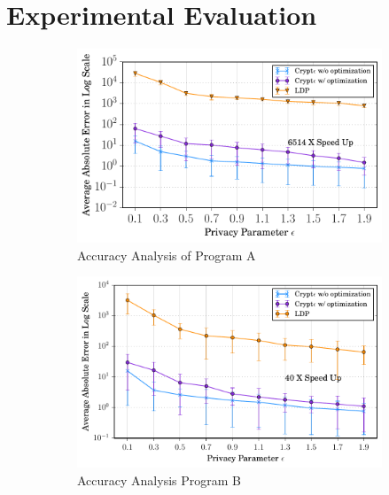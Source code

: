 \section{Experimental Evaluation}
\begin{figure}[ht]

    \begin{subfigure}[b]{0.25\linewidth}
        \centering
         \includegraphics[width=1\linewidth]{t1_final.pdf}
        \caption{ Accuracy Analysis of Program A}
        \label{fig:P1}
    \end{subfigure}%
    \begin{subfigure}[b]{0.25\linewidth}
    \centering \includegraphics[width=1\linewidth]{t5_final.pdf}
        \caption{Accuracy Analysis Program B}
        \label{fig:mouse}\end{subfigure}%
    \begin{subfigure}[b]{0.25\linewidth}

\end{subfigure}
\end{figure}
